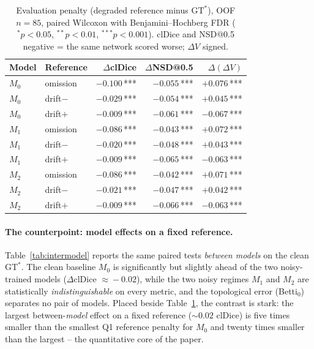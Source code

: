 \documentclass[
    bookmarks, bookmarksnumbered, bookmarksopen,
    colorlinks=true, citecolor=blue, linkcolor=blue, urlcolor=blue
]{techrep}
\newcommand{\gtstar}{\ensuremath{\mathrm{GT}^{\!*}}}
\begin{document}
\begin{table}[htb]
  \centering
  \caption{Evaluation penalty (degraded reference minus $\gtstar$), OOF $n{=}85$, paired
  Wilcoxon with Benjamini--Hochberg FDR ($^{*}p{<}0.05$, $^{**}p{<}0.01$, $^{***}p{<}0.001$).
  clDice and NSD@0.5 negative = the same network scored worse; $\Delta V$ signed.}
  \label{tab:penalty}
  \small
  \begin{tabular}{llrrr}
    \toprule
    Model & Reference & $\Delta$clDice & $\Delta$NSD@0.5 & $\Delta(\Delta V)$ \\
    \midrule
    $M_0$ & omission & $-0.100$\,*** & $-0.055$\,*** & $+0.076$\,*** \\
    $M_0$ & drift$-$ & $-0.029$\,*** & $-0.054$\,*** & $+0.045$\,*** \\
    $M_0$ & drift$+$ & $-0.009$\,*** & $-0.061$\,*** & $-0.067$\,*** \\
    \midrule
    $M_1$ & omission & $-0.086$\,*** & $-0.043$\,*** & $+0.072$\,*** \\
    $M_1$ & drift$-$ & $-0.020$\,*** & $-0.048$\,*** & $+0.043$\,*** \\
    $M_1$ & drift$+$ & $-0.009$\,*** & $-0.065$\,*** & $-0.063$\,*** \\
    \midrule
    $M_2$ & omission & $-0.086$\,*** & $-0.042$\,*** & $+0.071$\,*** \\
    $M_2$ & drift$-$ & $-0.021$\,*** & $-0.047$\,*** & $+0.042$\,*** \\
    $M_2$ & drift$+$ & $-0.009$\,*** & $-0.066$\,*** & $-0.063$\,*** \\
    \bottomrule
  \end{tabular}
\end{table}

\paragraph{The counterpoint: model effects on a fixed reference.} Table~\ref{tab:intermodel}
reports the same paired tests \emph{between models} on the clean $\gtstar$. The clean baseline
$M_0$ is significantly but slightly ahead of the two noisy-trained models ($\Delta$clDice
$\approx\!-0.02$), while the two noisy regimes $M_1$ and $M_2$ are statistically
\emph{indistinguishable} on every metric, and the topological error (Betti$_0$) separates no pair
of models. Placed beside Table~\ref{tab:penalty}, the contrast is stark: the largest
between-\emph{model} effect on a fixed reference ($\sim0.02$ clDice) is five times smaller than
the smallest Q1 reference penalty for $M_0$ and twenty times smaller than the largest -- the
quantitative core of the paper.
\end{document}
